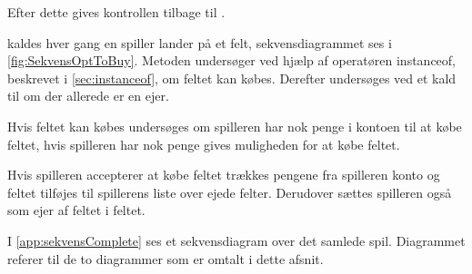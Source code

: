 Efter dette gives kontrollen tilbage til .

 kaldes hver gang en spiller lander på et felt, sekvensdiagrammet ses i \vref{fig:SekvensOptToBuy}. Metoden undersøger ved hjælp af operatøren instanceof, beskrevet i \vref{sec:instanceof}, om feltet kan købes. Derefter undersøges ved et kald til  om der allerede er en ejer.

Hvis feltet kan købes undersøges om spilleren har nok penge i kontoen til at købe feltet, hvis spilleren har nok penge gives muligheden for at købe  feltet.

Hvis spilleren accepterer at købe feltet trækkes pengene fra spilleren konto og feltet tilføjes til spillerens liste over ejede felter. Derudover sættes spilleren også som ejer af feltet i feltet.

I \vref{app:sekvensComplete} ses et sekvensdiagram over det samlede spil. Diagrammet referer til de to diagrammer som er omtalt i dette afsnit.
